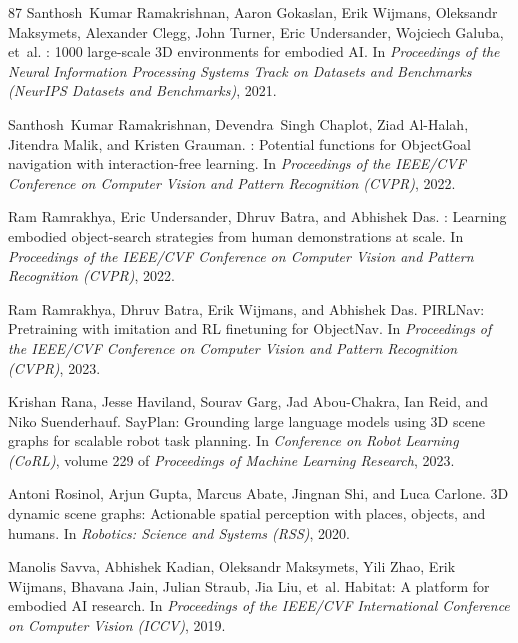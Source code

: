 \documentclass[10pt]{article}
\begin{document}
\begin{thebibliography}{87}
Santhosh~Kumar Ramakrishnan, Aaron Gokaslan, Erik Wijmans, Oleksandr Maksymets, Alexander Clegg, John Turner, Eric Undersander, Wojciech Galuba, et~al.
: 1000 large-scale {3D} environments for embodied {AI}.
\newblock In \emph{Proceedings of the Neural Information Processing Systems Track on Datasets and Benchmarks (NeurIPS Datasets and Benchmarks)}, 2021.

Santhosh~Kumar Ramakrishnan, Devendra~Singh Chaplot, Ziad Al-Halah, Jitendra Malik, and Kristen Grauman.
: Potential functions for {ObjectGoal} navigation with interaction-free learning.
\newblock In \emph{Proceedings of the IEEE/CVF Conference on Computer Vision and Pattern Recognition (CVPR)}, 2022.

Ram Ramrakhya, Eric Undersander, Dhruv Batra, and Abhishek Das.
: Learning embodied object-search strategies from human demonstrations at scale.
\newblock In \emph{Proceedings of the IEEE/CVF Conference on Computer Vision and Pattern Recognition (CVPR)}, 2022.

Ram Ramrakhya, Dhruv Batra, Erik Wijmans, and Abhishek Das.
\newblock PIRLNav: Pretraining with imitation and RL finetuning for ObjectNav.
\newblock In \emph{Proceedings of the IEEE/CVF Conference on Computer Vision and Pattern Recognition (CVPR)}, 2023.

Krishan Rana, Jesse Haviland, Sourav Garg, Jad Abou-Chakra, Ian Reid, and Niko Suenderhauf.
\newblock SayPlan: Grounding large language models using 3D scene graphs for scalable robot task planning.
\newblock In \emph{Conference on Robot Learning (CoRL)}, volume 229 of \emph{Proceedings of Machine Learning Research}, 2023.

Antoni Rosinol, Arjun Gupta, Marcus Abate, Jingnan Shi, and Luca Carlone.
\newblock 3D dynamic scene graphs: Actionable spatial perception with places, objects, and humans.
\newblock In \emph{Robotics: Science and Systems (RSS)}, 2020.

Manolis Savva, Abhishek Kadian, Oleksandr Maksymets, Yili Zhao, Erik Wijmans, Bhavana Jain, Julian Straub, Jia Liu, et~al.
\newblock Habitat: A platform for embodied {AI} research.
\newblock In \emph{Proceedings of the IEEE/CVF International Conference on Computer Vision (ICCV)}, 2019.


\end{thebibliography}
\end{document}
